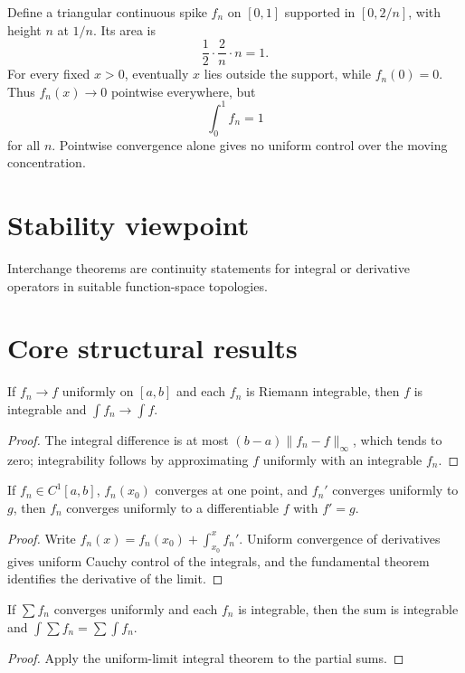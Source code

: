 \begin{example}\label{ex:ii12-expand-03}
Define a triangular continuous spike \(f_n\) on \([0,1]\) supported in
\([0,2/n]\), with height \(n\) at \(1/n\). Its area is
\[
\frac12\cdot\frac{2}{n}\cdot n=1.
\]
For every fixed \(x>0\), eventually \(x\) lies outside the support, while
\(f_n(0)=0\). Thus \(f_n(x)\to0\) pointwise everywhere, but
\[
\int_0^1 f_n=1
\]
for all \(n\). Pointwise convergence alone gives no uniform control over the
moving concentration.
\end{example}
\section{Stability viewpoint}
Interchange theorems are continuity statements for integral or derivative operators in suitable function-space topologies.

\section{Core structural results}

\begin{theorem}\label{thm:ii12-01}
If $f_n\to f$ uniformly on $[a,b]$ and each $f_n$ is Riemann integrable, then $f$ is integrable and $\int f_n\to\int f$.
\begin{proof}
The integral difference is at most $(b-a)\|f_n-f\|_\infty$, which tends to zero; integrability follows by approximating $f$ uniformly with an integrable $f_n$.
\end{proof}
\end{theorem}

\begin{theorem}\label{thm:ii12-02}
If $f_n\in C^1[a,b]$, $f_n(x_0)$ converges at one point, and $f_n'$ converges uniformly to $g$, then $f_n$ converges uniformly to a differentiable $f$ with $f'=g$.
\begin{proof}
Write $f_n(x)=f_n(x_0)+\int_{x_0}^x f_n'$. Uniform convergence of derivatives gives uniform Cauchy control of the integrals, and the fundamental theorem identifies the derivative of the limit.
\end{proof}
\end{theorem}

\begin{theorem}\label{thm:ii12-03}
If $\sum f_n$ converges uniformly and each $f_n$ is integrable, then the sum is integrable and $\int\sum f_n=\sum\int f_n$.
\begin{proof}
Apply the uniform-limit integral theorem to the partial sums.
\end{proof}
\end{theorem}

